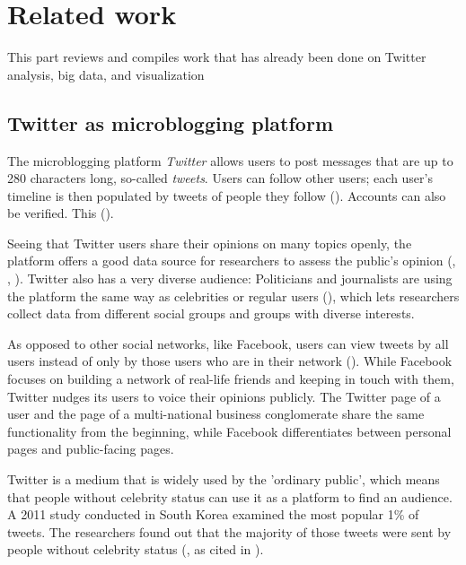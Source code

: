 \section{Related work}
This part reviews and compiles work that has already been done on Twitter analysis, big data, and visualization

\subsection{Twitter as microblogging platform}
The microblogging platform \emph{Twitter} allows users to post messages that are up to 280 characters long, so-called \emph{tweets}. Users can follow other users; each user's timeline is then populated by tweets of people they follow (\cite{thimmTwitterAlsWahlkampfmedium2012}). Accounts can also be verified. This  (\cite{twitterinc.VerifiedAccounts}).

Seeing that Twitter users share their opinions on many topics openly, the platform offers a good data source for researchers to assess the public's opinion (\cite{pak2010twitter}, \cite{pfaffenberger2016twitter}, \cite{broniatowski2014twitter}). Twitter also has a very diverse audience: Politicians and journalists are using the platform the same way as celebrities or regular users (\cite{pak2010twitter}), which lets researchers collect data from different social groups and groups with diverse interests.

As opposed to other social networks, like Facebook, users can view tweets by all users instead of only by those users who are in their network (\cite{parkDoesTwitterMotivate2013}). While Facebook focuses on building a network of real-life friends and keeping in touch with them, Twitter nudges its users to voice their opinions publicly. The Twitter page of a user and the page of a multi-national business conglomerate share the same functionality from the beginning, while Facebook differentiates between personal pages and public-facing pages.

Twitter is a medium that is widely used by the 'ordinary public', which means that people without celebrity status can use it as a platform to find an audience. A 2011 study conducted in South Korea examined the most popular 1\% of tweets. The researchers found out that the majority of those tweets were sent by people without celebrity status (\cite{chang2011structure}, as cited in \cite{parkDoesTwitterMotivate2013}).

